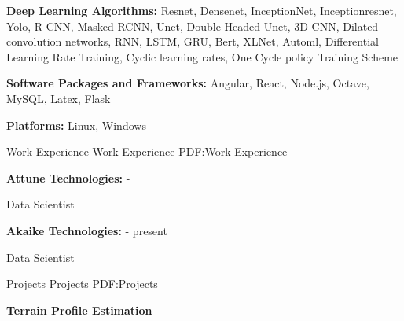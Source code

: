 \documentclass[letterpaper,MMMyyyy,nonstopmode]{simpleresumecv}
\begin{document}
\begin{Body}
                
                \BigGap


                \Entry
                    \textbf{Deep Learning Algorithms:}
                    Resnet, Densenet, InceptionNet, Inceptionresnet, Yolo, R-CNN, Masked-RCNN, 
                    Unet, Double Headed Unet, 3D-CNN, Dilated convolution networks, 
                    RNN, LSTM, GRU, Bert, XLNet, Automl, Differential Learning Rate Training, 
                    Cyclic learning rates, One Cycle policy Training Scheme
                
                
                \BigGap


                \Entry
                    \textbf{Software Packages and Frameworks:}
                    Angular, React, Node.js, Octave, MySQL, Latex, Flask
                
                
                \BigGap


                \Entry
                    \textbf{Platforms:}
                    Linux, Windows



            
            \Section
            {Work Experience}
            {Work Experience}
            {PDF:Work Experience}
            
            
                \Entry
                    \textbf{Attune Technologies:}
                    \hfill
                     - 

                    \Gap
                    Data Scientist
                
                    
                \BigGap

                \Entry
                    \textbf{Akaike Technologies:}
                    \hfill
                     - present

                    \Gap
                    Data Scientist

            

            \Section
            {Projects}
            {Projects}
            {PDF:Projects}


                \Entry
                    \textbf{Terrain Profile Estimation}


\end{Body}
\end{document}
